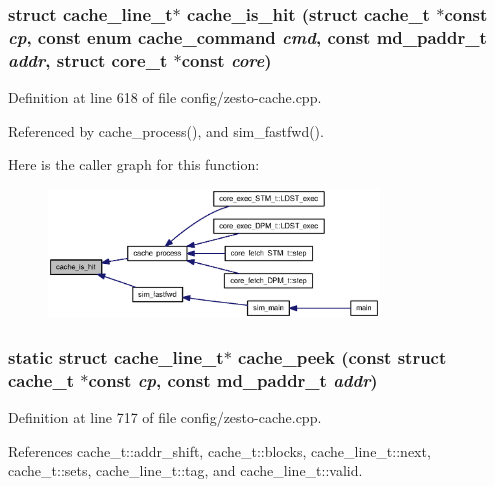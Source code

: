 \subsubsection[{cache\_\-is\_\-hit}]{\setlength{\rightskip}{0pt plus 5cm}struct {\bf cache\_\-line\_\-t}$\ast$ cache\_\-is\_\-hit (struct {\bf cache\_\-t} $\ast$const  {\em cp}, \/  const enum {\bf cache\_\-command} {\em cmd}, \/  const {\bf md\_\-paddr\_\-t} {\em addr}, \/  struct {\bf core\_\-t} $\ast$const  {\em core})\hspace{0.3cm}{\tt  [read]}}\label{config_2zesto-cache_8cpp_bbba2e5ba6186173122bcf1e35dc56eb}




Definition at line 618 of file config/zesto-cache.cpp.

Referenced by cache\_\-process(), and sim\_\-fastfwd().

Here is the caller graph for this function:\nopagebreak
\begin{figure}[H]
\begin{center}
\leavevmode
\includegraphics[width=249pt]{config_2zesto-cache_8cpp_bbba2e5ba6186173122bcf1e35dc56eb_icgraph}
\end{center}
\end{figure}
\subsubsection[{cache\_\-peek}]{\setlength{\rightskip}{0pt plus 5cm}static struct {\bf cache\_\-line\_\-t}$\ast$ cache\_\-peek (const struct {\bf cache\_\-t} $\ast$const  {\em cp}, \/  const {\bf md\_\-paddr\_\-t} {\em addr})\hspace{0.3cm}{\tt  [static, read]}}\label{config_2zesto-cache_8cpp_32083cc0a79d18fbb1932fca2d15df1e}




Definition at line 717 of file config/zesto-cache.cpp.

References cache\_\-t::addr\_\-shift, cache\_\-t::blocks, cache\_\-line\_\-t::next, cache\_\-t::sets, cache\_\-line\_\-t::tag, and cache\_\-line\_\-t::valid.

